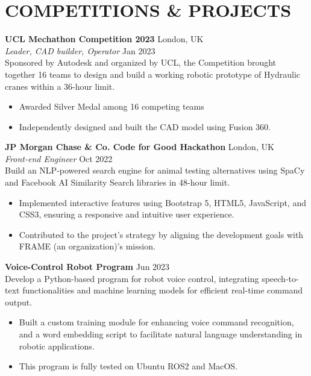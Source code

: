 \documentclass[a4paper,9pt]{extarticle}
\begin{document}
\section*{COMPETITIONS \& PROJECTS}
\noindent
\textbf{UCL Mechathon Competition 2023} \hfill London, UK\\ 
\textit{Leader, CAD builder, Operator}  \hfill Jan 2023 \\
Sponsored by Autodesk and organized by UCL, the Competition brought together 16 teams to design and build a working robotic prototype of Hydraulic cranes within a 36-hour limit.
\begin{itemize}
    \item Awarded Silver Medal among 16 competing teams
    \item Independently designed and built the CAD model using Fusion 360.
\end{itemize}
\noindent
\textbf{JP Morgan Chase \& Co. Code for Good Hackathon} \hfill London, UK\\
\textit{Front-end Engineer} \hfill Oct 2022\\
Build an NLP-powered search engine for animal testing alternatives using SpaCy and Facebook AI Similarity Search libraries in 48-hour limit.
\begin{itemize}
    \item Implemented interactive features using Bootstrap 5, HTML5, JavaScript, and CSS3, ensuring a responsive and intuitive user experience.
    \item Contributed to the project's strategy by aligning the development goals with FRAME (an organization)'s mission.
\end{itemize}
\noindent
\textbf{Voice-Control Robot Program} \hfill Jun 2023\\
Develop a Python-based program for robot voice control, integrating speech-to-text functionalities and machine learning models for efficient real-time command output. 
\begin{itemize}
    \item Built a custom training module for enhancing voice command recognition, and a word embedding script to facilitate natural language understanding in robotic applications. 
    \item This program is fully tested on Ubuntu ROS2 and MacOS.
\end{itemize}



\end{document}
